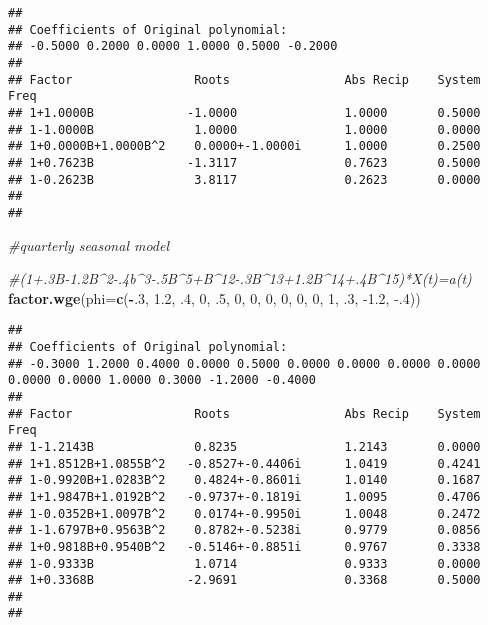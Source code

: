 \documentclass[]{article}
\newenvironment{Shaded}{\begin{snugshade}}{\end{snugshade}}
\newcommand{\CommentTok}[1]{\textcolor[rgb]{0.56,0.35,0.01}{\textit{#1}}}
\newcommand{\DataTypeTok}[1]{\textcolor[rgb]{0.13,0.29,0.53}{#1}}
\newcommand{\DecValTok}[1]{\textcolor[rgb]{0.00,0.00,0.81}{#1}}
\newcommand{\FloatTok}[1]{\textcolor[rgb]{0.00,0.00,0.81}{#1}}
\newcommand{\KeywordTok}[1]{\textcolor[rgb]{0.13,0.29,0.53}{\textbf{#1}}}
\newcommand{\NormalTok}[1]{#1}
\newcommand{\OperatorTok}[1]{\textcolor[rgb]{0.81,0.36,0.00}{\textbf{#1}}}
\begin{document}
\begin{verbatim}
## 
## Coefficients of Original polynomial:  
## -0.5000 0.2000 0.0000 1.0000 0.5000 -0.2000 
## 
## Factor                 Roots                Abs Recip    System Freq 
## 1+1.0000B             -1.0000               1.0000       0.5000
## 1-1.0000B              1.0000               1.0000       0.0000
## 1+0.0000B+1.0000B^2    0.0000+-1.0000i      1.0000       0.2500
## 1+0.7623B             -1.3117               0.7623       0.5000
## 1-0.2623B              3.8117               0.2623       0.0000
##   
## 
\end{verbatim}

\begin{Shaded}
\begin{Highlighting}[]
\CommentTok{#quarterly seasonal model}


\CommentTok{#(1+.3B-1.2B^2-.4b^3-.5B^5+B^12-.3B^13+1.2B^14+.4B^15)*X(t)=a(t)}
\KeywordTok{factor.wge}\NormalTok{(}\DataTypeTok{phi=}\KeywordTok{c}\NormalTok{(}\OperatorTok{-}\NormalTok{.}\DecValTok{3}\NormalTok{, }\FloatTok{1.2}\NormalTok{, }\FloatTok{.4}\NormalTok{, }\DecValTok{0}\NormalTok{, }\FloatTok{.5}\NormalTok{, }\DecValTok{0}\NormalTok{, }\DecValTok{0}\NormalTok{, }\DecValTok{0}\NormalTok{, }\DecValTok{0}\NormalTok{, }\DecValTok{0}\NormalTok{, }\DecValTok{0}\NormalTok{, }\DecValTok{1}\NormalTok{, }\FloatTok{.3}\NormalTok{, }\FloatTok{-1.2}\NormalTok{, }\FloatTok{-.4}\NormalTok{))}
\end{Highlighting}
\end{Shaded}

\begin{verbatim}
## 
## Coefficients of Original polynomial:  
## -0.3000 1.2000 0.4000 0.0000 0.5000 0.0000 0.0000 0.0000 0.0000 0.0000 0.0000 1.0000 0.3000 -1.2000 -0.4000 
## 
## Factor                 Roots                Abs Recip    System Freq 
## 1-1.2143B              0.8235               1.2143       0.0000
## 1+1.8512B+1.0855B^2   -0.8527+-0.4406i      1.0419       0.4241
## 1-0.9920B+1.0283B^2    0.4824+-0.8601i      1.0140       0.1687
## 1+1.9847B+1.0192B^2   -0.9737+-0.1819i      1.0095       0.4706
## 1-0.0352B+1.0097B^2    0.0174+-0.9950i      1.0048       0.2472
## 1-1.6797B+0.9563B^2    0.8782+-0.5238i      0.9779       0.0856
## 1+0.9818B+0.9540B^2   -0.5146+-0.8851i      0.9767       0.3338
## 1-0.9333B              1.0714               0.9333       0.0000
## 1+0.3368B             -2.9691               0.3368       0.5000
##   
## 
\end{verbatim}
\end{document}
